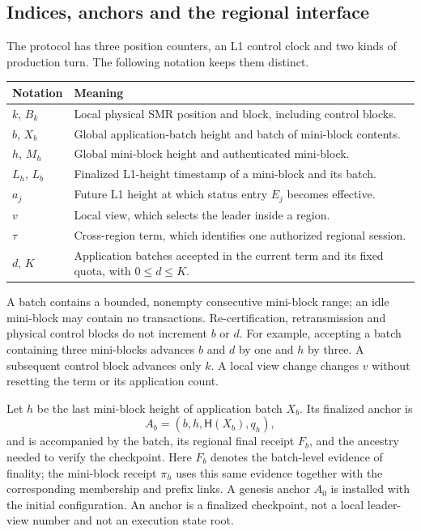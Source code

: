 \documentclass[11pt,a4paper,onecolumn]{article}
\newcommand{\Hash}{\mathsf H}
\newcounter{protocol}
\begin{document}
\subsection{Indices, anchors and the regional interface}\label{sec:indices}
The protocol has three position counters, an L1 control clock and two kinds
of production turn.
The following notation keeps them distinct.
\begin{center}\small
\begin{tabularx}{\linewidth}{@{}p{.16\linewidth}Y@{}}\toprule
Notation & Meaning\\\midrule
$k$, $B_k$ & Local physical SMR position and block, including control blocks.\\
$b$, $X_b$ & Global application-batch height and batch of mini-block contents.\\
$h$, $M_h$ & Global mini-block height and authenticated mini-block.\\
$L_h$, $L_b$ & Finalized L1-height timestamp of a mini-block and its batch.\\
$a_j$ & Future L1 height at which status entry $E_j$ becomes effective.\\
$v$ & Local view, which selects the leader inside a region.\\
$\tau$ & Cross-region term, which identifies one authorized regional session.\\
$d$, $K$ & Application batches accepted in the current term and its fixed quota,
with $0\leq d\leq K$.\\\bottomrule
\end{tabularx}
\end{center}
A batch contains a bounded, nonempty consecutive mini-block range; an idle
mini-block may contain no transactions. Re-certification, retransmission
and physical control blocks do not increment $b$ or $d$. For example,
accepting a batch containing three mini-blocks advances $b$ and $d$ by one and $h$
by three. A subsequent control block advances only $k$. A local view change
changes $v$ without resetting the term or its application count.

Let $h$ be the last mini-block height of application batch $X_b$.
Its finalized anchor is
\[
 A_b=(b,h,\Hash(X_b),q_h),
\]
and is accompanied by the batch, its regional final receipt $F_b$, and
the ancestry needed to verify the checkpoint. Here $F_b$ denotes the
batch-level evidence of finality; the mini-block receipt $\pi_h$ uses this
same evidence together with the corresponding membership and prefix links.
A genesis anchor $A_0$ is installed with the
initial configuration. An anchor is a finalized checkpoint, not a local
leader-view number and not an execution state root.
\end{document}
